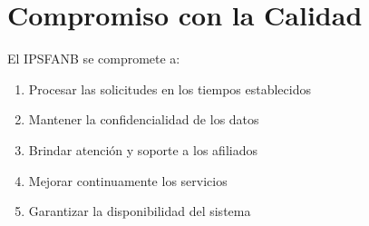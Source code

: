 \section*{Compromiso con la Calidad}

El IPSFANB se compromete a:

\begin{enumerate}[leftmargin=*]
    \item Procesar las solicitudes en los tiempos establecidos
    \item Mantener la confidencialidad de los datos
    \item Brindar atención y soporte a los afiliados
    \item Mejorar continuamente los servicios
    \item Garantizar la disponibilidad del sistema
\end{enumerate}

\vspace{1cm}
\begin{center}
\end{center}
